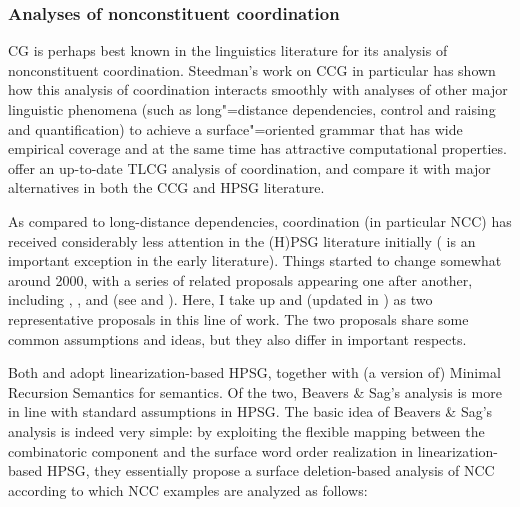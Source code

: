 \documentclass[output=paper
                ,modfonts
                ,nonflat
	        ,collection
	        ,collectionchapter
	        ,collectiontoclongg
 	        ,biblatex
                ,babelshorthands
                ,newtxmath
                ,draftmode
                ,colorlinks, citecolor=brown
]{./langsci/langscibook}
\begin{document}
\subsubsection{Analyses of nonconstituent coordination  \label{NCCcomparison}}

CG is perhaps best known in the linguistics literature for its
analysis of nonconstituent coordination. Steedman's work on CCG
\citep{Steedman97a,Steedman2000a-u,steedman2012} in particular has
shown how this analysis of coordination interacts smoothly with
analyses of other major linguistic phenomena (such as long"=distance
dependencies, control and raising and quantification) to achieve a
surface"=oriented grammar that has wide empirical coverage and at the
same time has attractive computational properties.
\citet{kubota-levine-coord,KubotaLevineBook} offer an up-to-date TLCG
analysis of coordination, and compare it with major alternatives in
both the CCG and HPSG literature.


As compared to long-distance dependencies, coordination (in particular
NCC) has received considerably less attention in the (H)PSG literature
initially (\citealt{sgww} is an important exception in the early
literature). Things started to change somewhat around 2000, with a
series of related proposals appearing one after another, including
\citet{Yatabe2001a}, \citet{BS2004a}, \citet{chaves07} and
\citet{Crysmann2003c} (see
 and ). Here, I take up
\citet{BS2004a} and \citet{Yatabe2001a} (updated in
\citealt{yatabe-tam2017}) as two representative proposals in this line
of work. The two proposals share some common assumptions and ideas,
but they also differ in important respects.

Both \citet{BS2004a} and \citet{Yatabe2001a} adopt linearization-based HPSG, together
with (a version of) Minimal Recursion Semantics for
semantics. Of the two, Beavers \& Sag's
analysis is more in line with standard assumptions in HPSG. The basic
idea of Beavers \& Sag's analysis is indeed very simple: by exploiting the flexible
mapping between the combinatoric component and the surface word order
realization in linearization-based HPSG, they essentially propose a
surface deletion-based analysis of NCC according to which NCC examples
are analyzed as follows:
\end{document}
